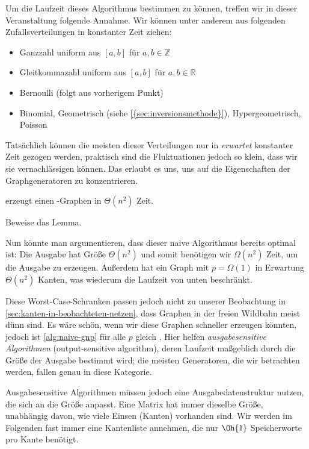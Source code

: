 Um  die Laufzeit dieses Algorithmus bestimmen zu können, treffen wir in dieser Veranstaltung folgende Annahme.
Wir können unter anderem aus folgenden Zufallsverteilungen in konstanter Zeit ziehen:
\begin{itemize}
    \item Ganzzahl uniform aus $[a, b]$ für $a, b \in \mathbb{Z}$
    \item Gleitkommazahl uniform aus $[a, b]$ für $a, b \in \mathbb{R}$
    \item Bernoulli (folgt aus vorherigem Punkt)
    \item Binomial, Geometrisch (siehe \cref{{sec:inversionsmethode}}), Hypergeometrisch, Poisson
\end{itemize}

Tatsächlich können die meisten dieser Verteilungen nur in \emph{erwartet} konstanter Zeit gezogen werden, praktisch sind die Fluktuationen jedoch so klein, dass wir sie vernachlässigen können.
Das erlaubt es uns, uns auf die Eigenschaften der Graphgeneratoren zu konzentrieren.

\begin{lemma}
    \label{lem:naive-gnp}
     erzeugt einen \Gnp-Graphen in $\Theta(n^2)$ Zeit.
\end{lemma}

\begin{exercise}
    Beweise das Lemma.
\end{exercise}

Nun könnte man argumentieren, dass dieser naive Algorithmus bereits optimal ist:
Die Ausgabe hat Größe $\Theta(n^2)$ und somit benötigen wir $\Omega(n^2)$ Zeit, um die Ausgabe zu erzeugen.
Außerdem hat ein Graph mit $p=\Omega(1)$ in Erwartung $\Theta(n^2)$ Kanten, was wiederum die Laufzeit von unten beschränkt.

Diese Worst-Case-Schranken passen jedoch nicht zu unserer Beobachtung in \cref{sec:kanten-in-beobachteten-netzen}, dass Graphen in der freien Wildbahn meist dünn sind.
Es wäre schön, wenn wir diese Graphen schneller erzeugen könnten, jedoch ist \cref{alg:naive-gnp} für alle $p$ gleich .
Hier  helfen \emph{ausgabesensitive Algorithmen} (output-sensitive algorithm), deren Laufzeit maßgeblich durch die Größe der Ausgabe bestimmt wird;
die meisten Generatoren, die wir betrachten werden, fallen genau in diese Kategorie.

Ausgabesensitive  Algorithmen müssen jedoch eine Ausgabedatenstruktur nutzen, die sich an die Größe anpasst.
Eine Matrix hat immer dieselbe Größe, unabhängig davon, wie viele Einsen (Kanten) vorhanden sind.
Wir werden im Folgenden fast immer eine Kantenliste annehmen, die nur $\Oh{1}$ Speicherworte pro Kante benötigt.

